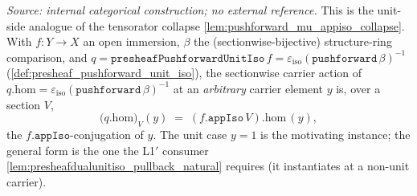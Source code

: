 \begin{lemma}\leanok
  \label{lem:pushforward_beta_unit_eps_app_one}
  \textit{Source: internal categorical construction; no external reference.}
  This is the unit-side analogue of the tensorator collapse
  \cref{lem:pushforward_mu_appiso_collapse}. With \(f : Y \to X\) an open immersion,
  \(\beta\) the (sectionwise-bijective) structure-ring comparison, and
  \(q = \mathtt{presheafPushforwardUnitIso}\,f = \varepsilon_{\mathrm{iso}}(\mathtt{pushforward}\,
  \beta)^{-1}\) (\cref{def:presheaf_pushforward_unit_iso}), the sectionwise carrier action of
  \(q.\mathrm{hom} = \varepsilon_{\mathrm{iso}}(\mathtt{pushforward}\,\beta)^{-1}\) at an
  \emph{arbitrary} carrier element \(y\) is, over a section \(V\),
  \[
    \bigl(q.\mathrm{hom}\bigr)_V (y)
      \;=\; (f.\mathtt{appIso}\,V).\mathrm{hom}\,(y) ,
  \]
  the \(f.\mathtt{appIso}\)-conjugation of \(y\). The unit case \(y = 1\) is the motivating
  instance; the general form is the one the L1\('\) consumer
  \cref{lem:presheafdualunitiso_pullback_natural} requires (it instantiates at a non-unit
  carrier).
\end{lemma}
